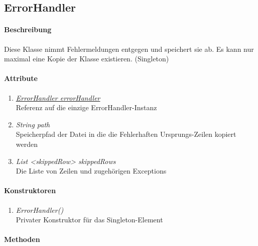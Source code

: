 \subsection*{ErrorHandler}\label{error}

\paragraph{Beschreibung}
Diese Klasse nimmt Fehlermeldungen entgegen und speichert sie ab. Es kann nur maximal eine Kopie der Klasse existieren. (Singleton)

\paragraph{Attribute}

\begin{enumerate}[$\bullet$]
	\item \underline{\textit{ErrorHandler errorHandler}} \\
	Referenz auf die einzige ErrorHandler-Instanz
	\item \textit{ String path} \\
	Speicherpfad der Datei in die die Fehlerhaften Ursprungs-Zeilen kopiert werden
	\item \textit{List <skippedRow> skippedRows} \\
	Die Liste von Zeilen und zugehörigen Exceptions
\end{enumerate}

\paragraph{Konstruktoren}
\begin{enumerate}[-]
	\item \textit{ErrorHandler()} \\
	Privater Konstruktor für das Singleton-Element
\end{enumerate}

\paragraph{Methoden}

